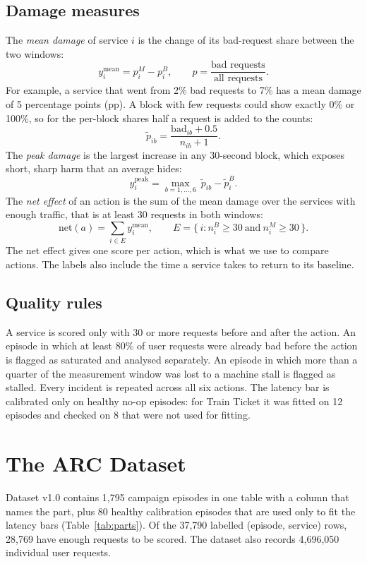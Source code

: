 \subsection{Damage measures}
The \emph{mean damage} of service $i$ is the change of its bad-request share between the two windows:
\begin{equation}
y_i^{\mathrm{mean}} = p_i^{M} - p_i^{B}, \qquad p = \frac{\text{bad requests}}{\text{all requests}}.
\end{equation}
For example, a service that went from 2\% bad requests to 7\% has a mean damage of 5 percentage points (pp). A block with few requests could show exactly 0\% or 100\%, so for the per-block shares half a request is added to the counts:
\begin{equation}
\tilde{p}_{ib} = \frac{\mathrm{bad}_{ib} + 0.5}{n_{ib} + 1}.
\end{equation}
The \emph{peak damage} is the largest increase in any 30-second block, which exposes short, sharp harm that an average hides:
\begin{equation}
y_i^{\mathrm{peak}} = \max_{b=1,\ldots,6}\ \tilde{p}_{ib} - \tilde{p}_i^{B}.
\end{equation}
The \emph{net effect} of an action is the sum of the mean damage over the services with enough traffic, that is at least 30 requests in both windows:
\begin{equation}
\mathrm{net}(a) = \sum_{i \in E} y_i^{\mathrm{mean}}, \qquad E = \{\, i : n_i^{B} \geq 30 \ \text{and}\ n_i^{M} \geq 30 \,\}.
\end{equation}
The net effect gives one score per action, which is what we use to compare actions. The labels also include the time a service takes to return to its baseline.

\subsection{Quality rules}
A service is scored only with 30 or more requests before and after the action. An episode in which at least 80\% of user requests were already bad before the action is flagged as saturated and analysed separately. An episode in which more than a quarter of the measurement window was lost to a machine stall is flagged as stalled. Every incident is repeated across all six actions. The latency bar is calibrated only on healthy no-op episodes: for Train Ticket it was fitted on 12 episodes and checked on 8 that were not used for fitting.

\section{The ARC Dataset}
Dataset v1.0 contains 1,795 campaign episodes in one table with a column that names the part, plus 80 healthy calibration episodes that are used only to fit the latency bars (Table~\ref{tab:parts}). Of the 37,790 labelled (episode, service) rows, 28,769 have enough requests to be scored. The dataset also records 4,696,050 individual user requests.

